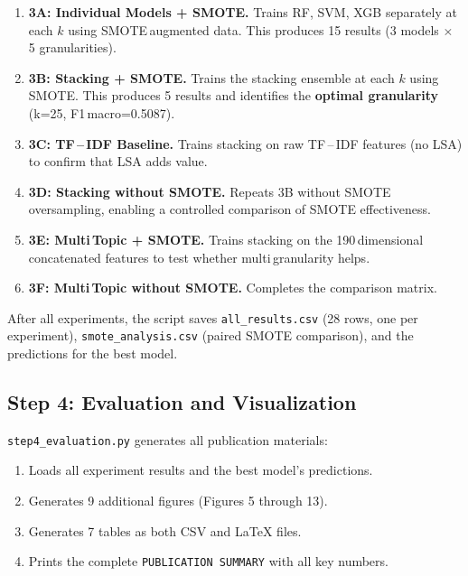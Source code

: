 \documentclass[12pt,a4paper,twoside]{article}
\theoremstyle{definition}
\begin{document}
\begin{enumerate}[leftmargin=2em]
    \item \textbf{3A: Individual Models + SMOTE.} Trains RF, SVM, XGB separately at each $k$ using SMOTE\,augmented data. This produces 15 results (3 models $\times$ 5 granularities).

    \item \textbf{3B: Stacking + SMOTE.} Trains the stacking ensemble at each $k$ using SMOTE. This produces 5 results and identifies the \textbf{optimal granularity} (k=25, F1\,macro=0.5087).

    \item \textbf{3C: TF\,--\,IDF Baseline.} Trains stacking on raw TF\,--\,IDF features (no LSA) to confirm that LSA adds value.

    \item \textbf{3D: Stacking without SMOTE.} Repeats 3B without SMOTE oversampling, enabling a controlled comparison of SMOTE effectiveness.

    \item \textbf{3E: Multi\,Topic + SMOTE.} Trains stacking on the 190\,dimensional concatenated features to test whether multi\,granularity helps.

    \item \textbf{3F: Multi\,Topic without SMOTE.} Completes the comparison matrix.
\end{enumerate}

After all experiments, the script saves \texttt{all\_results.csv} (28 rows, one per experiment), \texttt{smote\_analysis.csv} (paired SMOTE comparison), and the predictions for the best model.

\subsection{Step 4: Evaluation and Visualization}

\texttt{step4\_evaluation.py} generates all publication materials:

\begin{enumerate}[leftmargin=2em]
    \item Loads all experiment results and the best model's predictions.
    \item Generates 9 additional figures (Figures 5 through 13).
    \item Generates 7 tables as both CSV and LaTeX files.
    \item Prints the complete \texttt{PUBLICATION SUMMARY} with all key numbers.
\end{enumerate}
\end{document}
